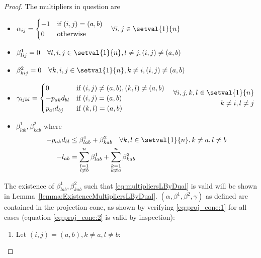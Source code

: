 \begin{proof}
	The multipliers in question are
	\begin{itemize}
		\item $\alpha_{ij} = 
			\begin{cases}
				-1&\text{if }(i,j) = (a,b)\\
				0&\text{otherwise}
			\end{cases}
			\quad\forall i,j \in\setval{1}{n}$
		\item $\beta^1_{lij} = 0\quad\forall l,i,j\in\setval{1}{n}, l\neq j, (i,j) \neq (a,b)$
		\item $\beta^2_{kij} = 0\quad\forall k,i,j\in\setval{1}{n}, k\neq i, (i,j) \neq (a,b)$
		\item $\gamma_{ijkl} = 
			\begin{cases}
				0&\text{if }(i,j) \neq (a,b), (k,l) \neq (a,b)\\
				-p_{ak}d_{bl}&\text{if }(i,j) = (a,b)\\
				p_{ai}d_{bj}&\text{if }(k,l) = (a,b)\\
			\end{cases}\quad
			\begin{aligned}
				\forall i,j,k,l\in\setval{1}{n}\\
				k\neq i, l\neq j
			\end{aligned}$
		\item $\beta^1_{lab}, \beta^2_{kab}$ where
			\begin{align}
			\label{eq:multipliersLByDual}
				\begin{aligned}
					-p_{ak}d_{bl}&\leq \beta^1_{lab}+\beta^2_{kab}\quad\forall k,l\in\setval{1}{n}, k\neq a, l\neq b\\
					-l_{ab}&=\sum_{\substack{l=1\\l\neq b}}^n\beta^1_{lab} + \sum_{\substack{k=1\\k\neq a}}^n\beta^2_{kab}
				\end{aligned}
			\end{align}
	\end{itemize}
	The existence of $\beta^1_{lab}, \beta^2_{kab}$ such that \eqref{eq:multipliersLByDual} is valid will be shown in Lemma~\ref{lemma:ExistenceMultipliersLByDual}. $(\alpha,\beta^1,\beta^2,\gamma)$ as defined are contained in the projection cone, as shown by verifying \eqref{eq:proj_cone:1} for all cases (equation \eqref{eq:proj_cone:2} is valid by inspection):
	\begin{enumerate}
		\item Let $(i,j)=(a,b), k\neq a, l\neq b$:
			\begin{equation*}

\end{equation*}
\end{enumerate}
\end{proof}

